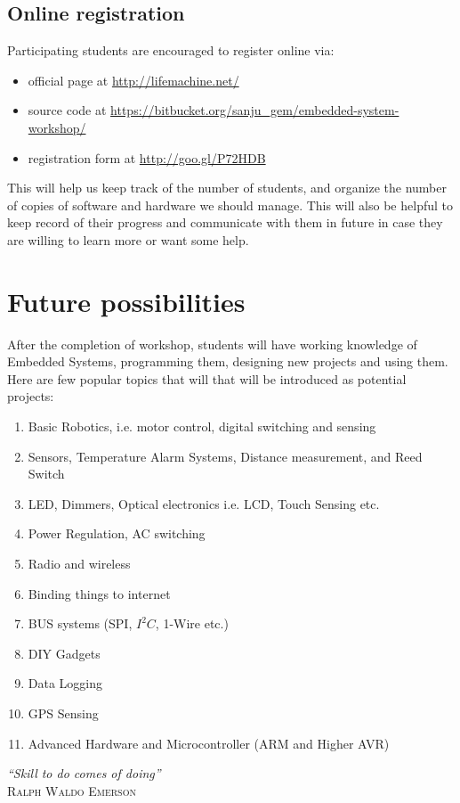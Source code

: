 \documentclass[12pt]{article} %
\begin{document}
\subsection{Online registration} %
Participating students are encouraged to register online via: 
\begin{itemize}
\item official page at \url{http://lifemachine.net/}
\item source code at \url{https://bitbucket.org/sanju_gem/embedded-system-workshop/}
\item registration form at \url{http://goo.gl/P72HDB}
\end{itemize}
This will help us keep track of the number of students, and organize the number of copies of software and hardware we should manage. This will also be helpful to keep record of their progress and communicate with them in future in case they are willing to learn more or want some help.

\section{Future possibilities} %
After the completion of workshop, students will have working knowledge of Embedded Systems, programming them, designing new projects and using them. Here are few popular topics that will that will be introduced as potential projects:
\begin{enumerate}
\item Basic Robotics, i.e. motor control, digital switching and sensing
\item Sensors, Temperature Alarm Systems, Distance measurement, and Reed Switch
\item LED, Dimmers, Optical electronics i.e. LCD, Touch Sensing etc.
\item Power Regulation, AC switching
\item Radio and wireless
\item Binding things to internet  
\item BUS systems (SPI, $I^2C$, 1-Wire etc.)
\item DIY Gadgets
\item Data Logging
\item GPS Sensing
\item Advanced Hardware and Microcontroller (ARM and Higher AVR)
\end{enumerate}
\vspace{0.5cm}
\emph{\large “Skill to do comes of doing”}\\
\textsc {Ralph Waldo Emerson}
\end{document}
